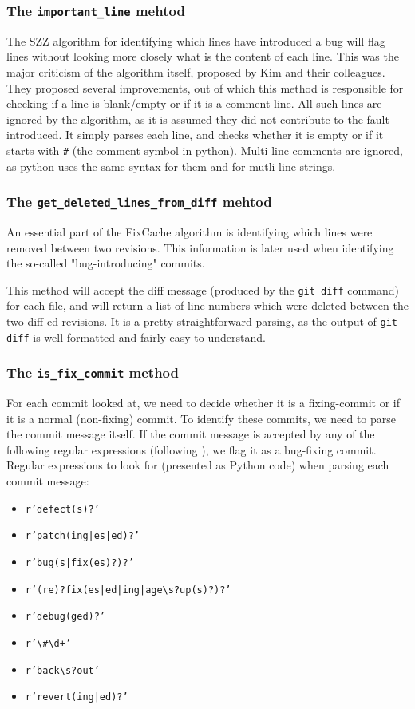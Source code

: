 \documentclass[12pt,twoside,notitlepage]{report}
\newcommand{\fxch}{FixCache }
\begin{document}
\subsubsection*{The \texttt{important\_line} mehtod}
The SZZ\cite{SZZ} algorithm for identifying which lines have introduced a bug will flag lines without looking more closely what is the content of each line. This was the major criticism of the algorithm itself, proposed by Kim and their colleagues\cite{KimZim}. They proposed several improvements, out of which this method is responsible for checking if a line is blank/empty or if it is a comment line. All such lines are ignored by the algorithm, as it is assumed they did not contribute to the fault introduced. It simply parses each line, and checks whether it is empty or if it starts with \texttt{\#} (the comment symbol in python). Multi-line comments are ignored, as python uses the same syntax for them and for mutli-line strings.
\subsubsection*{The \texttt{get\_deleted\_lines\_from\_diff} mehtod}
An essential part of the \fxch algorithm is identifying which lines were removed between two revisions. This information is later used when identifying the so-called "bug-introducing" commits.

This method will accept the diff message (produced by the \texttt{git diff} command) for each file, and will return a list of line numbers which were deleted between the two diff-ed revisions. It is a pretty straightforward parsing, as the output of \texttt{git diff} is well-formatted and fairly easy to understand.
\subsubsection*{The \texttt{is\_fix\_commit} method}
For each commit looked at, we need to decide whether it is a fixing-commit or if it is a normal (non-fixing) commit. To identify these commits, we need to parse the commit message itself. If the commit message is accepted by any of the following regular expressions (following \cite{Sadowski}), we flag it as a bug-fixing commit. Regular expressions to look for (presented as Python code) when parsing each commit message:
\begin{itemize}
\item \texttt{r'defect(s)?'}
\item \texttt{r'patch(ing|es|ed)?'}
\item \texttt{r'bug(s|fix(es)?)?'}
\item \texttt{r'(re)?fix(es|ed|ing|age\textbackslash s?up(s)?)?'}
\item \texttt{r'debug(ged)?'}
\item \texttt{r'\textbackslash\#\textbackslash d+'}
\item \texttt{r'back\textbackslash s?out'}
\item \texttt{r'revert(ing|ed)?'}
\end{itemize}
\end{document}
